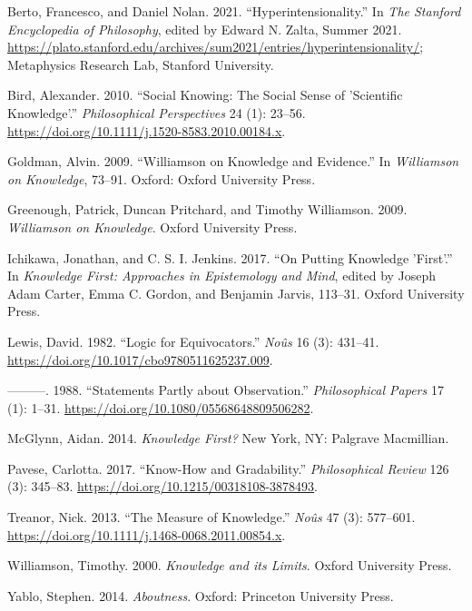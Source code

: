 \documentclass[
  letterpaper,
  DIV=11,
  numbers=noendperiod]{scrartcl}
\newlength{\cslhangindent}
\newlength{\cslentryspacingunit} %
\newenvironment{CSLReferences}[2] %
 {%
  \setlength{\parindent}{0pt}
  \ifodd #1
  \let\oldpar\par
  \def\par{\hangindent=\cslhangindent\oldpar}
  \fi
  \setlength{\parskip}{#2\cslentryspacingunit}
 }%
 {}
\begin{document}
\hypertarget{refs}{}
\begin{CSLReferences}{1}{0}
\leavevmode{}%
Berto, Francesco, and Daniel Nolan. 2021. {``{Hyperintensionality}.''}
In \emph{The {Stanford} Encyclopedia of Philosophy}, edited by Edward N.
Zalta, {S}ummer 2021.
\url{https://plato.stanford.edu/archives/sum2021/entries/hyperintensionality/};
Metaphysics Research Lab, Stanford University.

\leavevmode{}%
Bird, Alexander. 2010. {``Social Knowing: The Social Sense of
'Scientific Knowledge'.''} \emph{Philosophical Perspectives} 24 (1):
23--56. \url{https://doi.org/10.1111/j.1520-8583.2010.00184.x}.

\leavevmode{}%
Goldman, Alvin. 2009. {``Williamson on Knowledge and Evidence.''} In
\emph{{Williamson on Knowledge}}, 73--91. Oxford: Oxford University
Press.

\leavevmode{}%
Greenough, Patrick, Duncan Pritchard, and Timothy Williamson. 2009.
\emph{{Williamson on Knowledge}}. Oxford University Press.

\leavevmode{}%
Ichikawa, Jonathan, and C. S. I. Jenkins. 2017. {``On Putting Knowledge
'First'.''} In \emph{Knowledge First: Approaches in Epistemology and
Mind}, edited by Joseph Adam Carter, Emma C. Gordon, and Benjamin
Jarvis, 113--31. Oxford University Press.

\leavevmode{}%
Lewis, David. 1982. {``Logic for Equivocators.''} \emph{No{û}s} 16 (3):
431--41. \url{https://doi.org/10.1017/cbo9780511625237.009}.

\leavevmode{}%
---------. 1988. {``Statements Partly about Observation.''}
\emph{Philosophical Papers} 17 (1): 1--31.
\url{https://doi.org/10.1080/05568648809506282}.

\leavevmode{}%
McGlynn, Aidan. 2014. \emph{Knowledge First?} New York, NY: Palgrave
Macmillian.

\leavevmode{}%
Pavese, Carlotta. 2017. {``Know-How and Gradability.''}
\emph{Philosophical Review} 126 (3): 345--83.
\url{https://doi.org/10.1215/00318108-3878493}.

\leavevmode{}%
Treanor, Nick. 2013. {``The Measure of Knowledge.''} \emph{Noûs} 47 (3):
577--601. \url{https://doi.org/10.1111/j.1468-0068.2011.00854.x}.

\leavevmode{}%
Williamson, Timothy. 2000. \emph{{Knowledge and its Limits}}. Oxford
University Press.

\leavevmode{}%
Yablo, Stephen. 2014. \emph{Aboutness}. Oxford: Princeton University
Press.

\end{CSLReferences}
\end{document}
